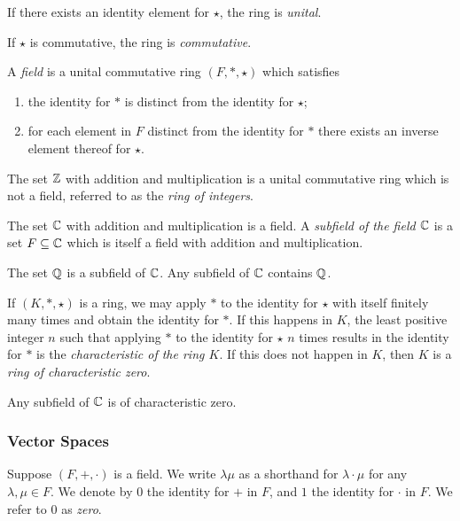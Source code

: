   If there exists an identity element for \(\star\), the ring is \emph{unital}.

  If \(\star\) is commutative, the ring is \emph{commutative}.
\Edf

\Bdf
  A \emph{field} is a unital commutative ring \((F, *, \star)\) which satisfies
  \begin{enumerate}
    \item the identity for \(*\) is distinct from the identity for \(\star\);
    \item for each element in \(F\) distinct from the identity for \(*\) there exists an inverse element thereof for
    \(\star\).
  \end{enumerate}
\Edf

The set \(\mathbb{Z}\) with addition and multiplication is a unital commutative ring which is not a field, referred to as
the \emph{ring of integers}.

The set \(\mathbb{C}\) with addition and multiplication is a field. A \emph{subfield of the field \(\mathbb{C}\)} is a set
\(F \subseteq \mathbb{C}\) which is itself a field with addition and multiplication.

The set \(\mathbb{Q}\) is a subfield of \(\mathbb{C}\). Any subfield of \(\mathbb{C}\) contains \(\mathbb{Q}\).

If \((K, *, \star)\) is a ring, we may apply \(*\) to the identity for \(\star\) with itself finitely many times and
obtain the identity for \(*\). If this happens in \(K\), the least positive integer \(n\) such that applying \(*\) to
the identity for \(\star\) \(n\) times results in the identity for \(*\) is the \emph{characteristic of the ring \(K\)}.
If this does not happen in \(K\), then \(K\) is a \emph{ring of characteristic zero}.

Any subfield of \(\mathbb{C}\) is of characteristic zero.

\subsubsection{Vector Spaces}

Suppose \((F, +, \cdot)\) is a field. We write \(\lambda \mu\) as a shorthand for \(\lambda \cdot \mu\) for any
\(\lambda, \mu \in F\). We denote by \(0\) the identity for \(+\) in \(F\), and \(1\) the identity for \(\cdot\) in
\(F\). We refer to \(0\) as \emph{zero}.

